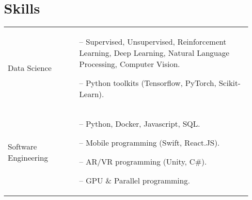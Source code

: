 \documentclass[a4paper,12pt]{article}
\begin{document}
\section{Skills}
\begin{tabularx}{\linewidth}{@{}l X@{}}
Data Science &  \small{
\begin{minipage}[t]{\linewidth}
    \begin{itemize}[nosep,after=\strut, leftmargin=1em, itemsep=1pt]
    \item[--]Supervised, Unsupervised, Reinforcement Learning, Deep Learning, Natural Language Processing, Computer Vision.
    \item[--]Python toolkits (Tensorflow, PyTorch, Scikit-Learn). 
    \end{itemize}
    \end{minipage}}
\\
Software Engineering  &  \small{
\begin{minipage}[t]{\linewidth}
    \begin{itemize}[nosep,after=\strut, leftmargin=1em, itemsep=1pt]
    \item[--]Python, Docker, Javascript, SQL.
    \item[--]Mobile programming (Swift, React.JS). 
    \item[--]AR/VR programming (Unity, C\#).
    \item[--] GPU \& Parallel programming.
    \end{itemize}
    \end{minipage}}
\end{tabularx}
%
%
\end{document}
